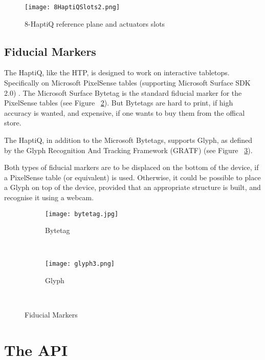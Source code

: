 \begin{figure}[H]
  \centering
  \texttt{[image: 8HaptiQSlots2.png]}
  \caption{8-HaptiQ reference plane and actuators slots}
  \label{fig:8haptiqref}
\end{figure}

\subsection{Fiducial Markers}

The HaptiQ, like the HTP, is designed to work on interactive tabletops. Specifically on Microsoft PixelSense tables (supporting Microsoft Surface SDK 2.0) \cite{pixelsense}. The Microsoft Surface Bytetag is the standard fiducial marker for the PixelSense tables (see Figure ~\ref{fig:Bytetag}). But Bytetags are hard to print, if high accuracy is wanted, and expensive, if one wants to buy them from the offical store.

The HaptiQ, in addition to the  Microsoft Bytetags, supports Glyph, as defined by the Glyph Recognition And Tracking Framework (GRATF) (see Figure ~\ref{fig:glyph}).

Both types of fiducial markers are to be displaced on the bottom of the device, if a PixelSense table (or equivalent) is used. Otherwise, it could be possible to place a Glyph on top of the device, provided that an appropriate structure is built, and recognise it using a webcam. 

\begin{figure}[H]
        \centering
        \begin{subfigure}[H]{0.3\textwidth}
                \texttt{[image: bytetag.jpg]}
                \caption{Bytetag}
                \label{fig:Bytetag}
        \end{subfigure}%
        ~ %
        \begin{subfigure}[H]{0.3\textwidth}
                \texttt{[image: glyph3.png]}
                \caption{Glyph}
                \label{fig:glyph}
        \end{subfigure}
        ~ %
        \caption{Fiducial Markers}
        \label{fig:fiducialMarkers}
\end{figure}

\section{The API}

